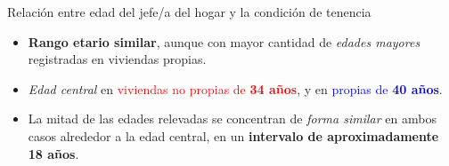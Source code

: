 \documentclass[aspectratio=169]{beamer}
\begin{document}
\begin{frame}{Relación entre edad del jefe/a del hogar y la condición de tenencia}
\begin{minipage}{.65\linewidth}
\begin{overlayarea}{\linewidth}{.75\textheight}
            \end{overlayarea}
        \end{minipage}
        \begin{minipage}{.34\linewidth}
            \small
            \setlength{\leftmargini}{8pt}
            \begin{itemize}
                \item<2-> \textbf{Rango etario similar}, aunque con mayor cantidad de \textit{edades mayores} registradas en viviendas propias.
                \item<3-> \textit{Edad central} en \textcolor{red}{viviendas no propias de \textbf{34 años}}, y en \textcolor{blue}{propias de \textbf{40 años}}.
                \item<4-> La mitad de las edades relevadas se concentran de \textit{forma similar} en ambos casos alrededor a la edad central, en un \textcolor{gold!90!black}{\textbf{intervalo de aproximadamente 18 años}}.
            \end{itemize}
        \end{minipage}
    \end{frame}
\end{document}
